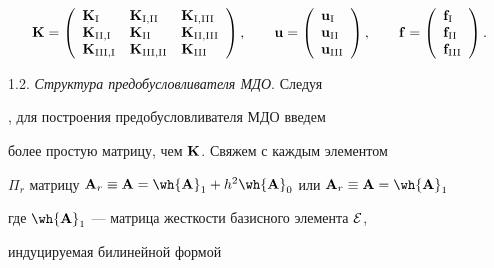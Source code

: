 \begin{equation*}




{\bold K}=\left(\begin{array}{lll}


{\bold K}_\ri & {\bold K}_{\ri,\rii} & {\bold K}_{\ri,\riii} \\


{\bold K}_{\rii,\ri} & {\bold K}_{\rii} & {\bold K}_{\rii,\riii} \\


{\bold K}_{\riii,\ri} & {\bold K}_{\riii,\rii} & {\bold K}_{\riii}


\end{array}


\right), \qquad {\bold u}=\left(\begin{array}{l}


{\bold u}_\ri \\ {\bold u}_{\rii} \\ {\bold u}_{\riii}


\end{array}


\right), \qquad {\bold f}=\left(\begin{array}{l}


{\bold f}_\ri \\ {\bold f}_{\rii} \\ {\bold f}_{\riii}


\end{array}


\right).


\end{equation*}








1.2. {\it Структура предобусловливателя МДО}. \label{MDO} Следуя


\cite{KJ1999}, \cite{KJ1999a} для построения предобусловливателя МДО введем 


более простую матрицу, чем ${\bold K}$. Свяжем с каждым элементом 


$\Pi_r$ матрицу ${\bold A}_r\equiv {\bold A} = \wh{{\bold A}}_1


+ h^2 \wh{{\bold A}}_0$ или ${\bold A}_r\equiv{\bold A}=\wh{{\bold A}}_1$


где $ \wh{{\bold A}}_1$ --- матрица жесткости базисного элемента ${\cal E}$,


индуцируемая билинейной формой 


